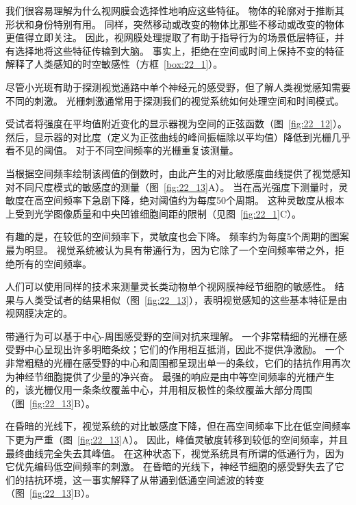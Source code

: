 我们很容易理解为什么视网膜会选择性地响应这些特征。 
物体的轮廓对于推断其形状和身份特别有用。
同样，突然移动或改变的物体比那些不移动或改变的物体更值得立即关注。
因此，视网膜处理提取了有助于指导行为的场景低层特征，并有选择地将这些特征传输到大脑。
事实上，拒绝在空间或时间上保持不变的特征解释了人类感知的时空敏感性（方框~\ref{box:22_1}）。


\begin{proposition}[人类感知的时空敏感性] \label{box:22_1}
	
	\quad \quad 尽管小光斑有助于探测视觉通路中单个神经元的感受野，但了解人类视觉感知需要不同的刺激。
	光栅刺激通常用于探测我们的视觉系统如何处理空间和时间模式。
	
	\quad \quad 受试者将强度在平均值附近变化的显示器视为空间的正弦函数（图~\ref{fig:22_12}）。
	然后，显示器的对比度（定义为正弦曲线的峰间振幅除以平均值）降低到光栅几乎看不见的阈值。
	对于不同空间频率的光栅重复该测量。
	
	\quad \quad 当根据空间频率绘制该阈值的倒数时，由此产生的对比敏感度曲线提供了视觉感知对不同尺度模式的敏感度的测量（图~\ref{fig:22_13}A）。
	当在高光强度下测量时，灵敏度在高空间频率下急剧下降，绝对阈值约为每度50个周期。
	这种灵敏度从根本上受到光学图像质量和中央凹锥细胞间距的限制（见图~\ref{fig:22_1}C）。
	
	\quad \quad 有趣的是，在较低的空间频率下，灵敏度也会下降。
	频率约为每度5个周期的图案最为明显。
	视觉系统被认为具有带通行为，因为它除了一个空间频率带之外，拒绝所有的空间频率。
	
	\quad \quad 人们可以使用同样的技术来测量灵长类动物单个视网膜神经节细胞的敏感性。
	结果与人类受试者的结果相似（图~\ref{fig:22_13}），表明视觉感知的这些基本特征是由视网膜决定的。
	
	\quad \quad 带通行为可以基于中心-周围感受野的空间对抗来理解。
	一个非常精细的光栅在感受野中心呈现出许多明暗条纹；它们的作用相互抵消，因此不提供净激励。
	一个非常粗糙的光栅在感受野的中心和周围都呈现出单一的条纹，它们的拮抗作用再次为神经节细胞提供了少量的净兴奋。
	最强的响应是由中等空间频率的光栅产生的，该光栅仅用一条条纹覆盖中心，并用相反极性的条纹覆盖大部分周围（图~\ref{fig:22_13}B）。
	
	\quad \quad 在昏暗的光线下，视觉系统的对比敏感度下降，但在高空间频率下比在低空间频率下更为严重（图~\ref{fig:22_13}A）。
	因此，峰值灵敏度转移到较低的空间频率，并且最终曲线完全失去其峰值。
	在这种状态下，视觉系统具有所谓的低通行为，因为它优先编码低空间频率的刺激。
	在昏暗的光线下，神经节细胞的感受野失去了它们的拮抗环境，这一事实解释了从带通到低通空间滤波的转变（图~\ref{fig:22_13}B）。
	

\end{proposition}
